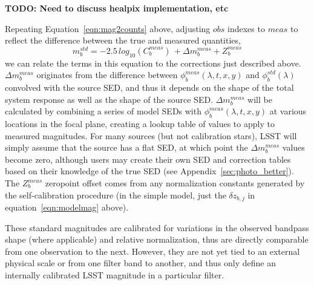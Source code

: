 \documentclass[12pt,preprint]{aastex}
\begin{document}
{\bf TODO: Need to discuss healpix implementation, etc}

Repeating Equation~\ref{eqn:mag2counts} above, adjusting ${obs}$ indexes to ${meas}$ to 
reflect the difference between the true and measured quantities,
\begin{equation}
\label{eqn:magsFromCounts}
m_b^{std} = -2.5\,log_{10}(C_b^{meas}) \, + \Delta m_b^{meas} + Z_b^{meas} 
\end{equation}
we can relate the terms in this equation to the corrections just
described above.  $\Delta m_b^{meas}$ originates from the difference
between $\phi_b^{meas}(\lambda,t,x,y)$ and $\phi_b^{std}(\lambda)$
convolved with the source SED, and thus it depends on the shape of the total
system response as well as the shape of the source SED. $\Delta
m_b^{meas}$ will be calculated by combining a series of model SEDs
with $\phi_b^{meas}(\lambda,t,x,y)$ at various locations in the focal
plane, creating a lookup table of values to apply to measured
magnitudes.  For many sources (but not calibration stars), LSST will
simply assume that the source has a flat SED, at which point the
$\Delta m_b^{meas}$ values become zero, although users may create
their own SED and correction tables based on their knowledge of the
true SED (see Appendix~\ref{sec:photo_better}).  The $Z_b^{meas}$
zeropoint offset comes from any normalization constants generated by the 
self-calibration procedure (in the simple model, just the $\delta z_{b,j}$ in
equation~\ref{eqn:modelmag} above). 

These standard magnitudes are calibrated for variations in the
observed bandpass shape (where applicable) and relative normalization,
thus are directly comparable from one observation to the
next. However, they are not yet tied to an external physical scale or
from one filter band to another, and thus only define an internally
calibrated LSST magnitude in a particular filter.
\end{document}
